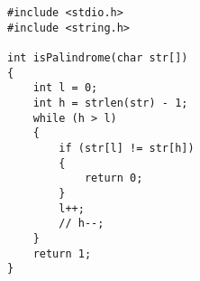 
\begin{lstlisting}[style=CStyle, caption=Mutant M5 of function isPalindrome., label=isPalindrome_m5]
#include <stdio.h> 
#include <string.h> 

int isPalindrome(char str[]) 
{ 
    int l = 0; 
    int h = strlen(str) - 1; 
    while (h > l) 
    { 
        if (str[l] != str[h]) 
        { 
            return 0;
        } 
        l++;
        // h--;
    } 
    return 1; 
} 
\end{lstlisting}